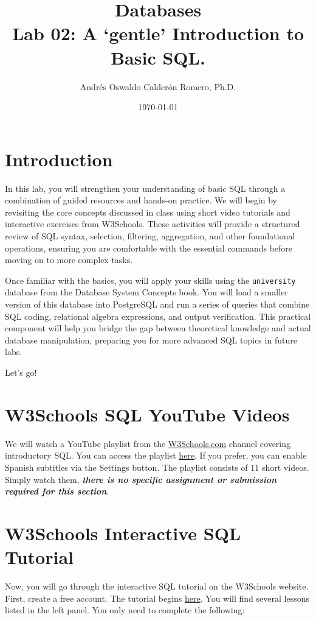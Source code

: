\documentclass{article}
\title{Databases \\ Lab 02: A `gentle' Introduction to Basic SQL.}
\author{Andrés Oswaldo Calderón Romero, Ph.D.}
\date{\today}
\begin{document}
\maketitle

\section{Introduction}
In this lab, you will strengthen your understanding of basic SQL through a combination of guided resources and hands-on practice. We will begin by revisiting the core concepts discussed in class using short video tutorials and interactive exercises from W3Schools. These activities will provide a structured review of SQL syntax, selection, filtering, aggregation, and other foundational operations, ensuring you are comfortable with the essential commands before moving on to more complex tasks.

Once familiar with the basics, you will apply your skills using the \texttt{university} database from the Database System Concepts book. You will load a smaller version of this database into PostgreSQL and run a series of queries that combine SQL coding, relational algebra expressions, and output verification. This practical component will help you bridge the gap between theoretical knowledge and actual database manipulation, preparing you for more advanced SQL topics in future labs.

Let's go!

\section{W3Schools SQL YouTube Videos}
We will watch a YouTube playlist from the \href{https://www.youtube.com/@w3schools}{W3Schools.com} channel covering introductory SQL. You can access the playlist \href{https://youtube.com/playlist?list=PLP9IO4UYNF0UQkBXlTMSw0CYsxv-GDkkI&si=qel9VClPHmerhGlz}{here}. If you prefer, you can enable Spanish subtitles via the Settings button. The playlist consists of 11 short videos. Simply watch them, \textit{\textbf{there is no specific assignment or submission required for this section}}.

\section{W3Schools Interactive SQL Tutorial}
Now, you will go through the interactive SQL tutorial on the W3Schools website. First, create a free account. The tutorial begins \href{https://www.w3schools.com/sql/}{here}. You will find several lessons listed in the left panel. You only need to complete the following:
\end{document}
